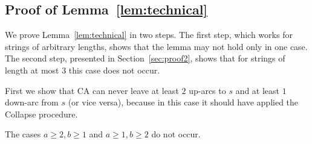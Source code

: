 \subsection{Proof of Lemma~\ref{lem:technical}}
\label{sec:proof1}
We prove Lemma~\ref{lem:technical} in two steps. The first step, which works for strings of arbitrary lengths, shows that the lemma may not hold only in one case. The second step, presented in Section~\ref{sec:proof2}, shows that for strings of length at most $3$ this case does not occur.

First we show that CA can never leave at least $2$ up-arcs to $s$ and at least $1$ down-arc from $s$ (or vice versa), because in this case it should have applied the Collapse procedure.
\begin{lemma}
\label{lem:edgecases}
The cases $a \ge 2, b \ge 1$ and $a \ge 1, b \ge 2$ do not occur.
\end{lemma}

